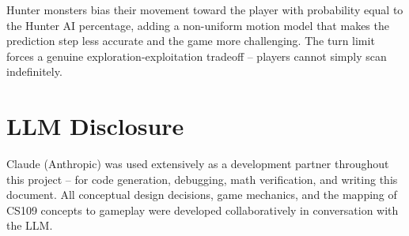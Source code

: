\documentclass[11pt]{article}
\begin{document}
Hunter monsters bias their movement toward the player with probability equal to the Hunter AI percentage, adding a non-uniform motion model that makes the prediction step less accurate and the game more challenging. The turn limit forces a genuine exploration-exploitation tradeoff -- players cannot simply scan indefinitely.

\section{LLM Disclosure}

Claude (Anthropic) was used extensively as a development partner throughout this project -- for code generation, debugging, math verification, and writing this document. All conceptual design decisions, game mechanics, and the mapping of CS109 concepts to gameplay were developed collaboratively in conversation with the LLM.
\end{document}

